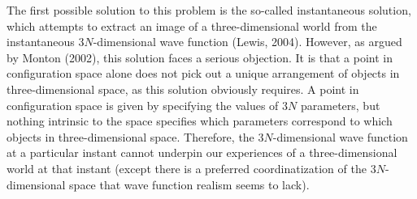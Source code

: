 The first possible solution to this problem is the so-called instantaneous solution, which attempts to extract an image of a three-dimensional world from the instantaneous $3N$-dimensional wave function (Lewis, 2004). However, as argued by Monton (2002),  this solution faces a serious objection. It is that a point in configuration space alone does not pick out  a unique arrangement of objects in three-dimensional space, as this solution obviously requires. A point in configuration space is given by specifying the values of $3N$ parameters, but nothing intrinsic to the space specifies which parameters correspond to which objects in three-dimensional space. Therefore, the $3N$-dimensional wave function at a particular instant cannot underpin our experiences of a three-dimensional world at that instant (except there is a preferred coordinatization of the $3N$-dimensional space that wave function realism seems to lack). 


